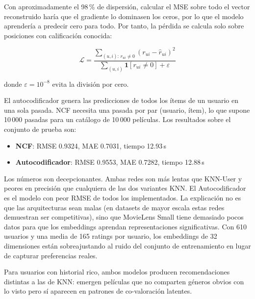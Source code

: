 Con aproximadamente el 98\,\% de dispersión, calcular el MSE sobre todo el vector reconstruido haría que el gradiente lo dominasen los ceros, por lo que el modelo aprendería a predecir cero para todo. Por tanto, la pérdida se calcula solo sobre posiciones con calificación conocida:

\begin{equation}
    \mathcal{L} = \frac{\displaystyle\sum_{(u,i):\,r_{ui}\neq 0}(r_{ui} - \hat{r}_{ui})^2}
                       {\displaystyle\sum_{(u,i)} \mathbf{1}[r_{ui}\neq 0] + \varepsilon}
\end{equation}

donde $\varepsilon = 10^{-8}$ evita la división por cero.

El autocodificador genera las predicciones de todos los ítems de un usuario en una sola pasada. NCF necesita una pasada por par (usuario, ítem), lo que supone 10\,000 pasadas para un catálogo de 10\,000 películas. Los resultados sobre el conjunto de prueba son:

\begin{itemize}
    \item \textbf{NCF}: RMSE 0.9324, MAE 0.7031, tiempo 12.93\,s
    \item \textbf{Autocodificador}: RMSE 0.9553, MAE 0.7282, tiempo 12.88\,s
\end{itemize}

Los números son decepcionantes. Ambas redes son más lentas que KNN-User y peores en precisión que cualquiera de las dos variantes KNN. El Autocodificador es el modelo con peor RMSE de todos los implementados. La explicación no es que las arquitecturas sean malas (en datasets de mayor escala estas redes demuestran ser competitivas), sino que MovieLens Small tiene demasiado pocos datos para que los embeddings aprendan representaciones significativas. Con 610 usuarios y una media de 165 ratings por usuario, los embeddings de 32 dimensiones están sobreajustando al ruido del conjunto de entrenamiento en lugar de capturar preferencias reales.

Para usuarios con historial rico, ambos modelos producen recomendaciones distintas a las de KNN: emergen películas que no comparten géneros obvios con lo visto pero sí aparecen en patrones de co-valoración latentes.
